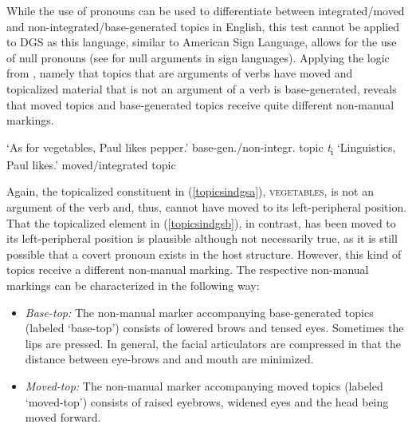 \noindent While the use of pronouns can be used to differentiate between integrated/moved and non-integrated/base-generated topics in English, this test cannot be applied to DGS as this language, similar to American Sign Language, allows for the use of null pronouns (see \citealt{lillo1986two} for null arguments in sign languages). Applying the logic from \citet{aarons1994aspects}, namely that topics that are arguments of verbs have moved and topicalized material that is not an argument of a verb is base-generated, reveals that moved topics and base-generated topics receive quite different non-manual markings.

\begin{exe}
\ex\label{topicsindgs}\begin{xlist} 
\ex {} 
%
\glt `As for vegetables, Paul likes pepper.' \label{topicsindgsa} \hfill base-gen./non-integr. topic
\ex {}  \textit{t}\textsubscript{i} 
%
\glt `Linguistics, Paul likes.' \label{topicsindgsb} \hfill moved/integrated topic
\end{xlist}
\end{exe}


\noindent Again, the topicalized constituent in (\ref{topicsindgsa}), \textsc{vegetables}, is not an argument of the verb and, thus, cannot have moved to its left-peripheral position. That the topicalized element in (\ref{topicsindgsb}), in contrast, has been moved to its left-peripheral position is plausible although not necessarily true, as it is still possible that a covert pronoun exists in the host structure. However, this kind of topics receive a different non-manual marking. The respective non-manual markings can be characterized in the following way:

\begin{itemize}[itemsep=0pt]
	\item \textit{Base-top:} The non-manual marker accompanying base-generated topics (labeled `base-top') consists of lowered brows and tensed eyes. Sometimes the lips are pressed. In general, the facial articulators are compressed in that the distance between eye-brows and and mouth are minimized.
	\item \textit{Moved-top:} The non-manual marker accompanying moved topics (labeled `moved-top') consists of raised eyebrows, widened eyes and the head being moved forward.
\end{itemize}

